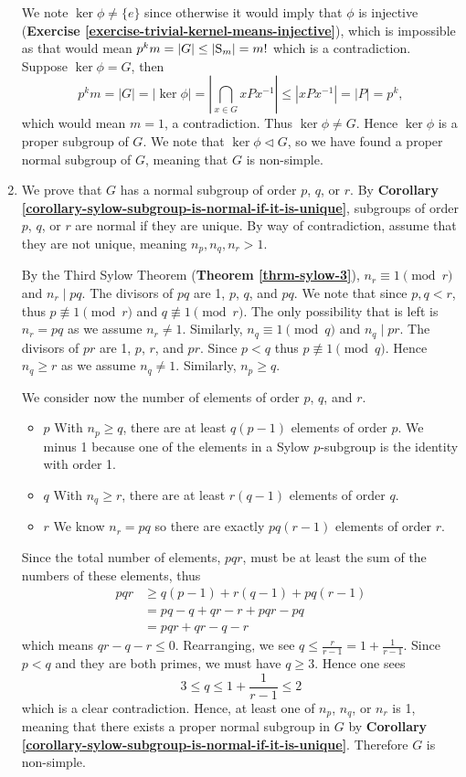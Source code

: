 \begin{enumerate}
    We note $\ker\phi \neq \{e\}$ since otherwise it would imply that $\phi$ is injective (\textbf{Exercise \ref{exercise-trivial-kernel-means-injective}}), which is impossible as that would mean $p^km = |G| \leq |\mathrm{S}_{m}| = m!$ which is a contradiction. Suppose $\ker\phi = G$, then
    \[
        p^km = |G| = |\ker\phi| = \left|\bigcap_{x \in G} xPx^{-1}\right| \leq |xPx^{-1}| = |P| = p^k,
    \]
    which would mean $m = 1$, a contradiction. Thus $\ker\phi \neq G$. Hence $\ker\phi$ is a proper subgroup of $G$. We note that $\ker\phi \lhd G$, so we have found a proper normal subgroup of $G$, meaning that $G$ is non-simple.

    \item We prove that $G$ has a normal subgroup of order $p$, $q$, or $r$. By \textbf{Corollary \ref{corollary-sylow-subgroup-is-normal-if-it-is-unique}}, subgroups of order $p$, $q$, or $r$ are normal if they are unique. By way of contradiction, assume that they are not unique, meaning $n_p, n_q, n_r > 1$.
    
    By the Third Sylow Theorem (\textbf{Theorem \ref{thrm-sylow-3}}), $n_r \equiv 1 \pmod r$ and $n_r \mid pq$. The divisors of $pq$ are 1, $p$, $q$, and $pq$. We note that since $p, q < r$, thus $p \not\equiv 1 \pmod r$ and $q \not\equiv 1 \pmod r$. The only possibility that is left is $n_r = pq$ as we assume $n_r \neq 1$. Similarly, $n_q \equiv 1 \pmod q$ and $n_q \mid pr$. The divisors of $pr$ are 1, $p$, $r$, and $pr$. Since $p < q$ thus $p \not\equiv 1 \pmod q$. Hence $n_q \geq r$ as we assume $n_q \neq 1$. Similarly, $n_p \geq q$.
    
    We consider now the number of elements of order $p$, $q$, and $r$.
    \begin{itemize}
        \item $\boxed{p}$ With $n_p \geq q$, there are at least $q(p-1)$ elements of order $p$. We minus 1 because one of the elements in a Sylow $p$-subgroup is the identity with order 1.
        \item $\boxed{q}$ With $n_q \geq r$, there are at least $r(q-1)$ elements of order $q$.
        \item $\boxed{r}$ We know $n_r = pq$ so there are exactly $pq(r-1)$ elements of order $r$.
    \end{itemize}
    Since the total number of elements, $pqr$, must be at least the sum of the numbers of these elements, thus
    \begin{align*}
        pqr &\geq q(p-1) + r(q-1) + pq(r-1)\\
        &= pq - q + qr - r + pqr - pq\\
        &= pqr + qr - q - r
    \end{align*}
    which means $qr - q - r \leq 0$. Rearranging, we see $q \leq \frac{r}{r-1} = 1 + \frac{1}{r-1}$. Since $p < q$ and they are both primes, we must have $q \geq 3$. Hence one sees
    \[
        3 \leq q \leq 1 + \frac{1}{r-1} \leq 2
    \]
    which is a clear contradiction. Hence, at least one of $n_p$, $n_q$, or $n_r$ is 1, meaning that there exists a proper normal subgroup in $G$ by \textbf{Corollary \ref{corollary-sylow-subgroup-is-normal-if-it-is-unique}}. Therefore $G$ is non-simple.
\end{enumerate}

